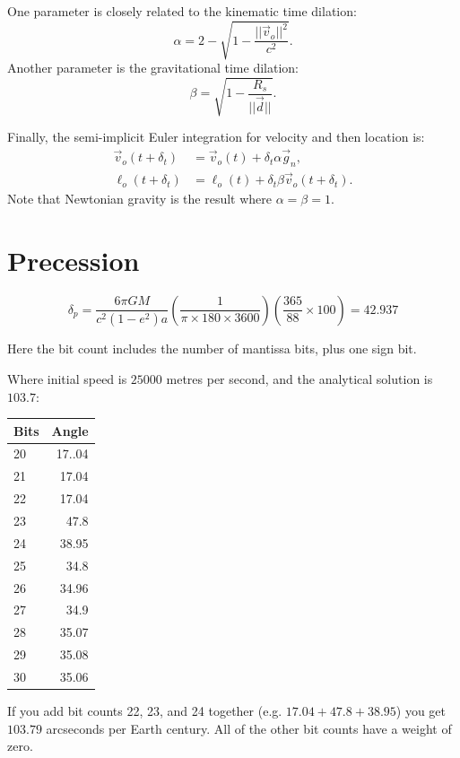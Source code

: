 \documentclass[12pt]{article}
\begin{document}
One parameter is closely related to the kinematic time dilation:
\begin{equation}
\label{eq_kinematic}
\alpha = 2 - \sqrt{1 - \frac{\lvert\lvert \vec{v}_{o}\rvert\rvert^2}{c^2}}.
\end{equation}
Another parameter is the gravitational time dilation:
\begin{equation}
\label{eq_gravitational}
\beta = \sqrt{1 - \frac{R_{s}}{\lvert \lvert \vec{d} \rvert \rvert}}.
\end{equation}

Finally, the semi-implicit Euler integration for velocity and then location is:
\begin{align}
\label{eq_velocity}
\vec{v}_{o}(t + \delta_t) &= \vec{v}_{o}(t) + \delta_{t} \alpha \vec{g}_n, \\
\label{eq_position}
\ell_{o}(t + \delta_t) &= \ell_{o}(t) + \delta_{t} \beta \vec{v}_{o}(t + \delta_t).
\end{align}
Note that Newtonian gravity is the result where $\alpha = \beta = 1$.


\section{Precession}

\begin{equation}
\label{delta_p}
\delta_{p} = \frac{6 \pi G M}{c^2 (1 - e^2) a} \left( \frac{1}{ \pi \times 180 \times 3600} \right) \left( \frac{365}{88} \times 100 \right) = 42.937
\end{equation}

Here the bit count includes the number of mantissa bits, plus one sign bit.

Where initial speed is $25000$ metres per second, and the analytical solution is $103.7$:
\begin{center}
\begin{tabular}{| l | r |}
  \hline
Bits & Angle \\
\hline
\hline
20 & 17..04 \\
21 & 17.04 \\
22 & 17.04 \\
23 & 47.8 \\
24 & 38.95 \\
25 & 34.8 \\
26 & 34.96 \\
27 & 34.9 \\
28 & 35.07 \\
29 & 35.08 \\
30 & 35.06 \\
  \hline  
\end{tabular}
\end{center}
If you add bit counts 22, 23, and 24 together (e.g. $17.04 + 47.8 + 38.95$) you get $103.79$ arcseconds per Earth century.
All of the other bit counts have a weight of zero.
\end{document}
